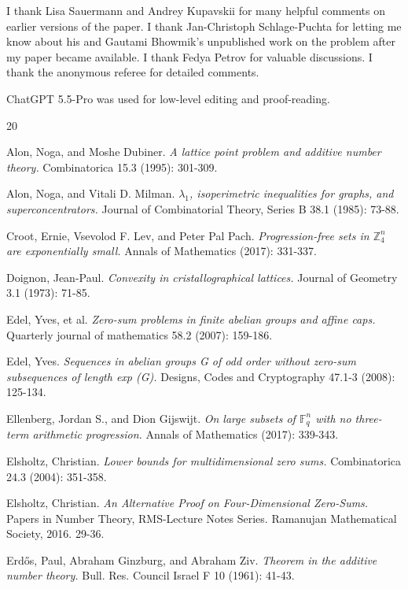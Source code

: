 \documentclass{daj}
\theoremstyle{definition}
\theoremstyle{remark}
\theoremstyle{definition}
\theoremstyle{definition}
\begin{document}
I thank Lisa Sauermann and Andrey Kupavskii for many helpful comments on earlier versions of the paper. I thank Jan-Christoph Schlage-Puchta for letting me know about his and Gautami Bhowmik's unpublished work on the problem after my paper became available. I thank Fedya Petrov for valuable discussions. I thank the anonymous referee for detailed comments. 

ChatGPT 5.5-Pro was used for low-level editing and proof-reading. 



\begin{thebibliography}{20}


 Alon, Noga, and Moshe Dubiner. {\it A lattice point problem and additive number theory.} Combinatorica 15.3 (1995): 301-309.

 Alon, Noga, and Vitali D. Milman. {\it $\lambda_1$, isoperimetric inequalities for graphs, and superconcentrators.} Journal of Combinatorial Theory, Series B 38.1 (1985): 73-88.

 Croot, Ernie, Vsevolod F. Lev, and Peter Pal Pach. {\it Progression-free sets in $\mathbb{Z}_4^n$ are exponentially small.} Annals of Mathematics (2017): 331-337.

 Doignon, Jean-Paul. {\it Convexity in cristallographical lattices.} Journal of Geometry 3.1 (1973): 71-85.

 Edel, Yves, et al. {\it Zero-sum problems in finite abelian groups and affine caps.} Quarterly journal of mathematics 58.2 (2007): 159-186.

 Edel, Yves. {\it Sequences in abelian groups G of odd order without zero-sum subsequences of length exp (G).} Designs, Codes and Cryptography 47.1-3 (2008): 125-134.

 Ellenberg, Jordan S., and Dion Gijswijt. {\it On large subsets of $\mathbb F_q^n$ with no three-term arithmetic progression.} Annals of Mathematics (2017): 339-343.

 Elsholtz, Christian. {\it Lower bounds for multidimensional zero sums.} Combinatorica 24.3 (2004): 351-358.

 Elsholtz, Christian. {\it An Alternative Proof on Four-Dimensional Zero-Sums.} Papers in Number Theory, RMS-Lecture Notes Series. Ramanujan Mathematical Society, 2016. 29-36.

 Erd{\H o}s, Paul, Abraham Ginzburg, and Abraham Ziv. {\it Theorem in the additive number theory.} Bull. Res. Council Israel F 10 (1961): 41-43.


\end{thebibliography}
\end{document}
